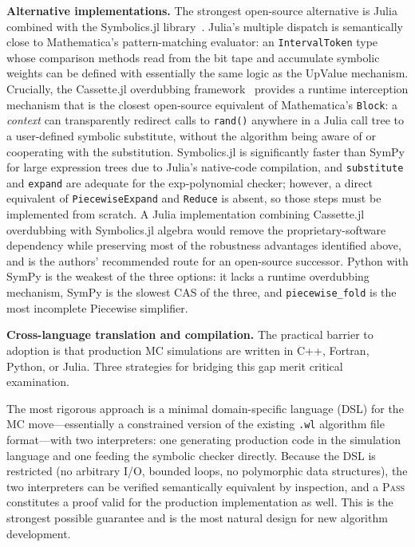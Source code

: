 \documentclass[twocolumn,10pt]{article}
\begin{document}
\medskip\noindent\textbf{Alternative implementations.}
The strongest open-source alternative is Julia~\cite{Bezanson2017}
combined with the Symbolics.jl library~\cite{Gowda2021}.  Julia's
multiple dispatch is semantically close to Mathematica's pattern-matching
evaluator: an \texttt{IntervalToken} type whose comparison methods read
from the bit tape and accumulate symbolic weights can be defined with
essentially the same logic as the UpValue mechanism.  Crucially, the
Cassette.jl overdubbing framework~\cite{Cassette} provides a runtime
interception mechanism that is the closest open-source equivalent of
Mathematica's \texttt{Block}: a \emph{context} can transparently
redirect calls to \texttt{rand()} anywhere in a Julia call tree to a
user-defined symbolic substitute, without the algorithm being aware of
or cooperating with the substitution.  Symbolics.jl is significantly
faster than SymPy for large expression trees due to Julia's native-code
compilation, and \texttt{substitute} and \texttt{expand} are adequate
for the exp-polynomial checker; however, a direct equivalent of
\texttt{PiecewiseExpand} and \texttt{Reduce} is absent, so those steps
must be implemented from scratch.  A Julia implementation combining
Cassette.jl overdubbing with Symbolics.jl algebra would remove the
proprietary-software dependency while preserving most of the robustness
advantages identified above, and is the authors' recommended route for
an open-source successor.  Python with SymPy is the weakest of the
three options: it lacks a runtime overdubbing mechanism, SymPy is the
slowest CAS of the three, and \texttt{piecewise\_fold} is the most
incomplete Piecewise simplifier.

\medskip\noindent\textbf{Cross-language translation and compilation.}
The practical barrier to adoption is that production MC simulations are
written in C++, Fortran, Python, or Julia.  Three strategies for
bridging this gap merit critical examination.

The most rigorous approach is a minimal domain-specific language (DSL)
for the MC move---essentially a constrained version of the existing
\texttt{.wl} algorithm file format---with two interpreters: one
generating production code in the simulation language and one feeding
the symbolic checker directly.  Because the DSL is restricted (no
arbitrary I/O, bounded loops, no polymorphic data structures), the two
interpreters can be verified semantically equivalent by inspection, and
a \textsc{Pass} constitutes a proof valid for the production
implementation as well.  This is the strongest possible guarantee and is
the most natural design for new algorithm development.
\end{document}
